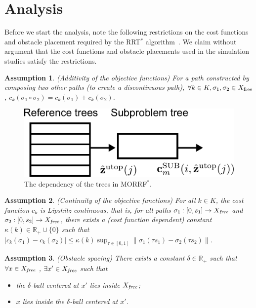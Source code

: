 \documentclass{article}
\newtheorem{asmp}{Assumption}
\begin{document}
\section{Analysis} 
\label{sec:theoretic_analysis}

Before we start the analysis, note the following restrictions on the cost functions and obstacle placement required by the RRT$^*$ algorithm~\cite{Karaman.Frazzoli:RSS10}.  
We claim without argument that the cost functions and obstacle placements used in the simulation studies satisfy the restrictions.
\begin{asmp}{(Additivity of the objective functions)}
\label{asmp:additivity}	
For a path constructed by composing two other paths (to create a discontinuous path), $\forall k\in K, \sigma_1,\sigma_2\in X_{\rm free}$, $c_{k}(\sigma_1\circ\sigma_2) = c_{k}(\sigma_1) + c_{k}(\sigma_2)$.
\end{asmp}

\begin{figure}[h]
\centering
\includegraphics[width=0.5\linewidth]{fig/cascade}
\caption{The dependency of the trees in MORRF$^{*}$.}
\label{fig:dependency}
\end{figure}

\begin{asmp}{(Continuity of the objective functions)}
\label{asmp:continuity}
For all $k\in K$, the cost function $c_{k}$ is Lipshitz continuous, that is, for all paths $\sigma_1 : [0, s_{1}] \rightarrow X_{\it free}$ and $ \sigma_2 : [0, s_{2}] \rightarrow X_{\it free}$, there exists a (cost function dependent) constant $\kappa(k)\in \mathbb{R}_{+}\cup \{0 \}$ such that $ | c_{k} ( \sigma_{1} ) - c_{k} ( \sigma_{2} ) | \leq \kappa(k) \sup_{\tau \in [0, 1]} \lVert \sigma_{1} (\tau s_{1}) - \sigma_{2} (\tau s_{2}) \rVert $.
\end{asmp}


\begin{asmp}{(Obstacle spacing)}
\label{asmp:spacing}
There exists a constant $ \delta \in \mathbb{R}_{+} $ such that $ \forall x \in X_{\it free} $ , $ \exists x' \in X_{\it free} $ such that
\begin{itemize}
\item the $ \delta $-ball centered at $ x' $ lies inside $ X_{\it free} $;
\item $ x $ lies inside the $ \delta $-ball centered at $ x' $.
\end{itemize}
\end{asmp}
\end{document}
